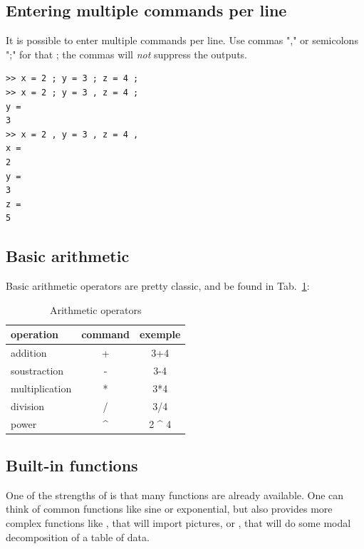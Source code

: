 	\subsection{Entering multiple commands per line}
		It is possible to enter multiple commands per line. 
		Use commas "," or semicolons ";" for that ; the commas will \emph{not} suppress the outputs.

\begin{lstlisting}
>> x = 2 ; y = 3 ; z = 4 ;
>> x = 2 ; y = 3 , z = 4 ;
y = 
3
>> x = 2 , y = 3 , z = 4 ,
x = 
2
y = 
3
z = 
5
\end{lstlisting}

	\subsection{Basic arithmetic}
		Basic arithmetic operators are pretty classic, and be found in Tab.~\ref{tab-basic_arithmetic}:
		\begin{table}[h!]\caption{Arithmetic operators}
			\label{tab-basic_arithmetic}
			\center
			\begin{tabular}{|l|c|c|}
				\hline
				operation & command & exemple \\
				\hline
				addition & + & 3+4 \\
				soustraction & - & 3-4 \\
				multiplication & * & 3*4 \\
				division & / & 3/4 \\
				power & \^{} & 2 \^{} 4 \\
				\hline
			\end{tabular}
		\end{table}

	\subsection{Built-in functions}
		One of the strengths of \matlab is that many functions are already available.
		One can think of common functions like sine or exponential, but \matlab also provides more complex functions like , that will import pictures, or , that will do some modal decomposition of a table of data.

